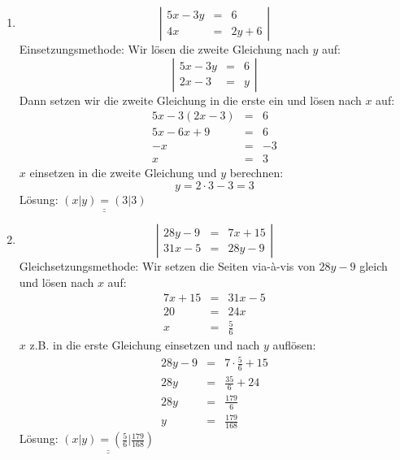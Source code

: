 \documentclass[%
11pt,%
twoside,%
titlepage,%
german,%
]{scrartcl}
\newcommand{\result}[1]{\underline{\underline{#1}}}
\begin{document}
\begin{enumerate}
\begin{enumerate}
  \item 
    \begin{displaymath}
      \left| 
        \begin{array}{rcl}
         5x-3y & = & 6 \\
         4x & = & 2y+6
        \end{array} \right|
    \end{displaymath}
    Einsetzungsmethode: Wir l\"osen die zweite Gleichung nach $y$ auf:
    \begin{displaymath}
      \left| 
        \begin{array}{rcl}
         5x-3y & = & 6 \\
         2x-3 & = & y
        \end{array} \right|
    \end{displaymath}
    Dann setzen wir die zweite Gleichung in die erste ein und l\"osen nach $x$ auf:
    \begin{eqnarray*}
      5x-3(2x-3) & = & 6 \\
      5x-6x+9 & = & 6 \\
      -x & = & -3 \\
      x & = & 3
    \end{eqnarray*}
    $x$ einsetzen in die zweite Gleichung und $y$ berechnen:
    \begin{displaymath}
      y = 2 \cdot 3 - 3 = 3
    \end{displaymath}
    L\"osung: $\result{(x|y)=(3|3)}$

  \item 
    \begin{displaymath}
      \left| 
        \begin{array}{rcl}
         28y-9 & = & 7x+15 \\
         31x-5 & = & 28y-9
        \end{array} \right|
    \end{displaymath}
    Gleichsetzungsmethode: Wir setzen die Seiten via-\`{a}-vis von $28y-9$ gleich und l\"osen nach $x$ auf:
    \begin{eqnarray*}
      7x+15 & = & 31x-5 \\
      20 & = & 24x \\
      x & = & \frac{5}{6}
    \end{eqnarray*}
    $x$ z.B. in die erste Gleichung einsetzen und nach $y$ aufl\"osen:
    \begin{eqnarray*}
      28y-9 & = & 7 \cdot \frac{5}{6}+15 \\
      28y & = & \frac{35}{6}+24 \\
      28y & = & \frac{179}{6} \\
      y & = & \frac{179}{168}
    \end{eqnarray*}
    L\"osung: $\result{(x|y)=(\frac{5}{6}|\frac{179}{168})}$



\end{enumerate}
\end{enumerate}
\end{document}

